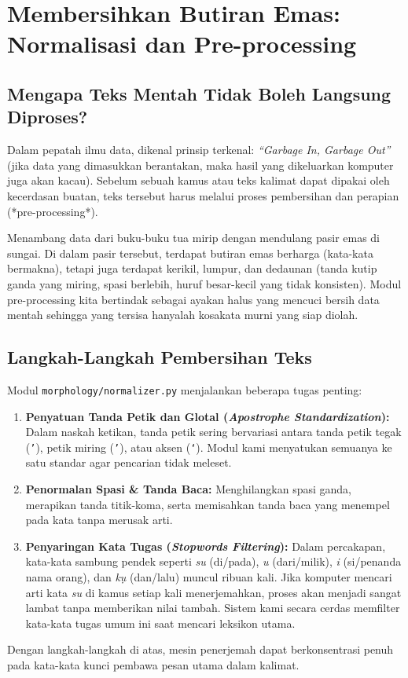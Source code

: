 \chapter{Membersihkan Butiran Emas: Normalisasi dan Pre-processing}

\section{Mengapa Teks Mentah Tidak Boleh Langsung Diproses?}
Dalam pepatah ilmu data, dikenal prinsip terkenal: \textit{“Garbage In, Garbage Out”} (jika data yang dimasukkan berantakan, maka hasil yang dikeluarkan komputer juga akan kacau). Sebelum sebuah kamus atau teks kalimat dapat dipakai oleh kecerdasan buatan, teks tersebut harus melalui proses pembersihan dan perapian (*pre-processing*).

\begin{infobox}
Menambang data dari buku-buku tua mirip dengan mendulang pasir emas di sungai. Di dalam pasir tersebut, terdapat butiran emas berharga (kata-kata bermakna), tetapi juga terdapat kerikil, lumpur, dan dedaunan (tanda kutip ganda yang miring, spasi berlebih, huruf besar-kecil yang tidak konsisten). Modul pre-processing kita bertindak sebagai ayakan halus yang mencuci bersih data mentah sehingga yang tersisa hanyalah kosakata murni yang siap diolah.
\end{infobox}

\section{Langkah-Langkah Pembersihan Teks}
Modul \texttt{morphology/normalizer.py} menjalankan beberapa tugas penting:

\begin{enumerate}
    \item \textbf{Penyatuan Tanda Petik dan Glotal (\textit{Apostrophe Standardization}):} Dalam naskah ketikan, tanda petik sering bervariasi antara tanda petik tegak (\texttt{'}), petik miring (\texttt{’}), atau aksen (\texttt{`}). Modul kami menyatukan semuanya ke satu standar agar pencarian tidak meleset.
    \item \textbf{Penormalan Spasi \& Tanda Baca:} Menghilangkan spasi ganda, merapikan tanda titik-koma, serta memisahkan tanda baca yang menempel pada kata tanpa merusak arti.
    \item \textbf{Penyaringan Kata Tugas (\textit{Stopwords Filtering}):} Dalam percakapan, kata-kata sambung pendek seperti \textit{su} (di/pada), \textit{u} (dari/milik), \textit{i} (si/penanda nama orang), dan \textit{k\d{u}} (dan/lalu) muncul ribuan kali. Jika komputer mencari arti kata \textit{su} di kamus setiap kali menerjemahkan, proses akan menjadi sangat lambat tanpa memberikan nilai tambah. Sistem kami secara cerdas memfilter kata-kata tugas umum ini saat mencari leksikon utama.
\end{enumerate}

Dengan langkah-langkah di atas, mesin penerjemah dapat berkonsentrasi penuh pada kata-kata kunci pembawa pesan utama dalam kalimat.
